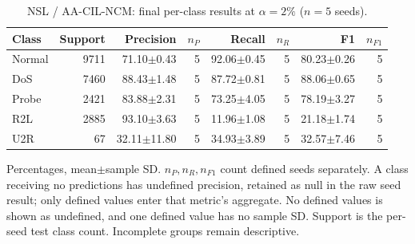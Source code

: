 \begin{table}[t]
\centering\scriptsize
\setlength{\tabcolsep}{3.3pt}
\caption{NSL / AA-CIL-NCM: final per-class results at $\alpha=2\%$ ($n=5$ seeds).}\label{tab:forgetting-class-nsl_kdd-aacil-ncm}
\begin{tabular}{lrrrrrrr}
\toprule
Class & Support & Precision & $n_P$ & Recall & $n_R$ & F1 & $n_{F1}$ \\
\midrule
Normal & 9711 & 71.10$\pm$0.43 & 5 & 92.06$\pm$0.45 & 5 & 80.23$\pm$0.26 & 5 \\
DoS & 7460 & 88.43$\pm$1.48 & 5 & 87.72$\pm$0.81 & 5 & 88.06$\pm$0.65 & 5 \\
Probe & 2421 & 83.88$\pm$2.31 & 5 & 73.25$\pm$4.05 & 5 & 78.19$\pm$3.27 & 5 \\
R2L & 2885 & 93.10$\pm$3.63 & 5 & 11.96$\pm$1.08 & 5 & 21.18$\pm$1.74 & 5 \\
U2R & 67 & 32.11$\pm$11.80 & 5 & 34.93$\pm$3.89 & 5 & 32.57$\pm$7.46 & 5 \\
\bottomrule
\end{tabular}
\par\smallskip\begin{minipage}{0.98\textwidth}\scriptsize Percentages, mean$\pm$sample SD. $n_P,n_R,n_{F1}$ count defined seeds separately. A class receiving no predictions has undefined precision, retained as null in the raw seed result; only defined values enter that metric's aggregate. No defined values is shown as undefined, and one defined value has no sample SD. Support is the per-seed test class count. Incomplete groups remain descriptive.\end{minipage}
\end{table}

